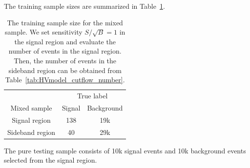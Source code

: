 \documentclass[12pt]{article}
\begin{document}
        The training sample sizes are summarized in Table~\ref{tab:training_sample_size_cwola_hunting_hv}.
        \begin{table}[htpb]
            \centering
            \caption{The training sample size for the mixed sample. We set sensitivity $S / \sqrt{B} = 1$ in the signal region and evaluate the number of events in the signal region. Then, the number of events in the sideband region can be obtained from Table~\ref{tab:HVmodel_cutflow_number}.}
            \label{tab:training_sample_size_cwola_hunting_hv}
            \begin{tabular}{c|cc}
                                & \multicolumn{2}{c}{True label} \\
                Mixed sample    & Signal       & Background      \\ \hline
                Signal region   & 138          & 19k             \\
                Sideband region & 40           & 29k
            \end{tabular}
        \end{table}

        The pure testing sample consists of 10k signal events and 10k background events selected from the signal region.
\end{document}
